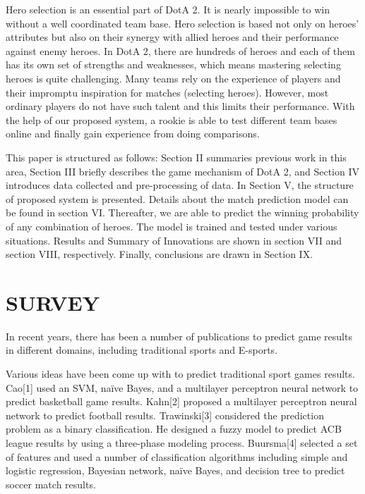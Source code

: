\documentclass[letterpaper, 10 pt, conference]{ieeeconf}  %
\begin{document}
Hero selection is an essential part of DotA 2. It is nearly impossible to win without a well coordinated team base. Hero selection is based not only on heroes' attributes but also on their synergy with allied heroes and their performance against enemy heroes. In DotA 2, there are hundreds of heroes and each of them has its own set of strengths and weaknesses, which means mastering selecting heroes is quite challenging. Many teams rely on the experience of players and their impromptu inspiration for matches (selecting heroes). However, most ordinary players do not have such talent and this limits their performance. With the help of our proposed system, a rookie is able to test different team bases online and finally gain experience from doing comparisons. 

This paper is structured as follows:  Section II summaries previous work in this area, Section III briefly describes the game mechanism of DotA 2, and Section IV introduces data collected and pre-processing of data. In Section V, the structure of proposed system is presented. Details about the match prediction model can be found in section VI. Thereafter, we are able to predict the winning probability of any combination of heroes. The model is trained and tested under various situations. Results and Summary of Innovations are shown in section VII and section VIII, respectively. Finally, conclusions are drawn in Section IX.

\section{SURVEY}
In recent years, there has been a number of publications to predict game results in different domains, including traditional sports and E-sports. 

Various ideas have been come up with to predict traditional sport games results. Cao[1] used an SVM, naïve Bayes, and a multilayer perceptron neural network to predict basketball game results. Kahn[2] proposed a multilayer perceptron neural network to predict football results. Trawinski[3] considered the prediction problem as a binary classification. He designed a fuzzy model to predict ACB league results by using a three-phase modeling process. Buursma[4] selected a set of features and used a number of classification algorithms including simple and logistic regression, Bayesian network, naïve Bayes, and decision tree to predict soccer match results.
\end{document}
